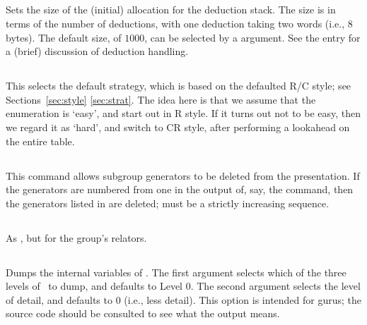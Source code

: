 \subsection{}

Sets the size of the (initial) allocation for the deduction stack.
The size is in terms of the number of deductions, with one deduction
  taking two words (i.e., 8 bytes).
The default size, of $1000$, can be selected by a  argument.
See the  entry for a (brief) discussion of deduction handling.

\subsection{}

This selects the default strategy, which is based on the defaulted
  R/C style; see Sections~\ref{sec:style} \amp \ref{sec:strat}.
The idea here is that we assume that the enumeration is `easy'\kern-1.5pt,
  and start out in R style.
If it turns out not to be easy, then we regard it as `hard'\kern-1.5pt,
  and switch to CR style, after performing a lookahead on the entire
  table.

\subsection{}

This command allows subgroup generators to be deleted from the
  presentation.
If the generators are numbered from one in the output of, say, the
   command, then the generators listed in  are
  deleted;  must be a strictly increasing sequence.

\subsection{}

As , but for the group's relators.

\subsection{}

Dumps the internal variables of \ace.
The first argument selects which of the three levels of \ace\ to dump, and
  defaults to Level $0$.
The second argument selects the level of detail, and defaults to $0$
  (i.e., less detail).
This option is intended for gurus; the source code should be consulted to
  see what the output means.

